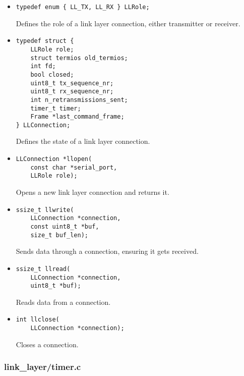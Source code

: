 \documentclass[11pt,a4paper,twocolumn]{article}
\begin{document}
\begin{itemize}
    \item \begin{lstlisting}
typedef enum { LL_TX, LL_RX } LLRole;
    \end{lstlisting}

          Defines the role of a link layer connection, either transmitter or receiver.

    \item \begin{lstlisting}
typedef struct {
    LLRole role;
    struct termios old_termios;
    int fd;
    bool closed;
    uint8_t tx_sequence_nr;
    uint8_t rx_sequence_nr;
    int n_retransmissions_sent;
    timer_t timer;
    Frame *last_command_frame;
} LLConnection;
    \end{lstlisting}

          Defines the state of a link layer connection.

    \item \begin{lstlisting}
LLConnection *llopen(
    const char *serial_port,
    LLRole role);
    \end{lstlisting}

          Opens a new link layer connection and returns it.

    \item \begin{lstlisting}
ssize_t llwrite(
    LLConnection *connection,
    const uint8_t *buf,
    size_t buf_len);
    \end{lstlisting}

          Sends data through a connection, ensuring it gets received.

    \item \begin{lstlisting}
ssize_t llread(
    LLConnection *connection, 
    uint8_t *buf);
    \end{lstlisting}

          Reads data from a connection.

    \item \begin{lstlisting}
int llclose(
    LLConnection *connection);
    \end{lstlisting}

          Closes a connection.
\end{itemize}

\subsubsection{link\_layer/timer.c}
\end{document}
